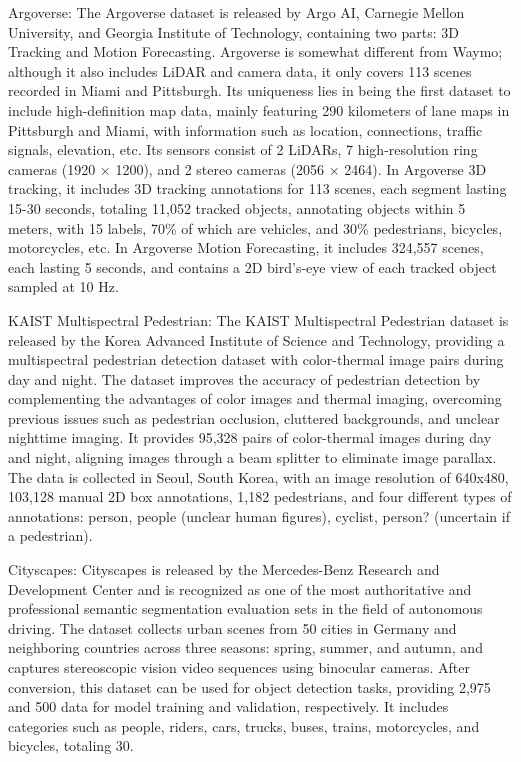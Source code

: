 \documentclass[journal]{IEEEtran}
\begin{document}
Argoverse\cite{chang2019argoverse}: The Argoverse dataset is released by Argo AI, Carnegie Mellon University, and Georgia Institute of Technology, containing two parts: 3D Tracking and Motion Forecasting. Argoverse is somewhat different from Waymo; although it also includes LiDAR and camera data, it only covers 113 scenes recorded in Miami and Pittsburgh. Its uniqueness lies in being the first dataset to include high-definition map data, mainly featuring 290 kilometers of lane maps in Pittsburgh and Miami, with information such as location, connections, traffic signals, elevation, etc. Its sensors consist of 2 LiDARs, 7 high-resolution ring cameras (1920 × 1200), and 2 stereo cameras (2056 × 2464). In Argoverse 3D tracking, it includes 3D tracking annotations for 113 scenes, each segment lasting 15-30 seconds, totaling 11,052 tracked objects, annotating objects within 5 meters, with 15 labels, 70\% of which are vehicles, and 30\% pedestrians, bicycles, motorcycles, etc. In Argoverse Motion Forecasting, it includes 324,557 scenes, each lasting 5 seconds, and contains a 2D bird’s-eye view of each tracked object sampled at 10 Hz.

KAIST Multispectral Pedestrian\cite{hwang2015multispectral}: The KAIST Multispectral Pedestrian dataset is released by the Korea Advanced Institute of Science and Technology, providing a multispectral pedestrian detection dataset with color-thermal image pairs during day and night. The dataset improves the accuracy of pedestrian detection by complementing the advantages of color images and thermal imaging, overcoming previous issues such as pedestrian occlusion, cluttered backgrounds, and unclear nighttime imaging. It provides 95,328 pairs of color-thermal images during day and night, aligning images through a beam splitter to eliminate image parallax. The data is collected in Seoul, South Korea, with an image resolution of 640x480, 103,128 manual 2D box annotations, 1,182 pedestrians, and four different types of annotations: person, people (unclear human figures), cyclist, person? (uncertain if a pedestrian).

Cityscapes\cite{cordts2016cityscapes}: Cityscapes is released by the Mercedes-Benz Research and Development Center and is recognized as one of the most authoritative and professional semantic segmentation evaluation sets in the field of autonomous driving. The dataset collects urban scenes from 50 cities in Germany and neighboring countries across three seasons: spring, summer, and autumn, and captures stereoscopic vision video sequences using binocular cameras. After conversion, this dataset can be used for object detection tasks, providing 2,975 and 500 data for model training and validation, respectively. It includes categories such as people, riders, cars, trucks, buses, trains, motorcycles, and bicycles, totaling 30.
\end{document}

